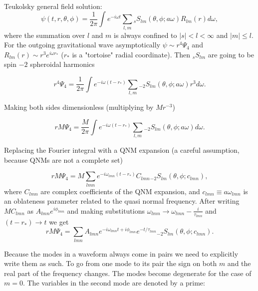 \documentclass[11pt]{article}
\begin{document}
 \\

\noindent
Teukolsky general field solution:
\begin{equation}
\psi(t,r,\theta,\phi) = \frac{1}{2\pi} \int {e^{-i\omega t} \sum_{l,m} {}_sS_{lm}(\theta, \phi ; a\omega )R_{lm}(r) d\omega },
\end{equation}
where the summation over $l$ and $m$ is always confined to $|s|< l < \infty$ and $|m| \leq l$. For the outgoing gravitational wave asymptotically $\psi \sim r^4\Psi_4$ and $R_{lm}(r) \sim r^3e^{i\omega r_*}$ ($r_*$ is a "tortoise" radial coordinate). Then ${}_sS_{lm}$ are going to be spin $\minus 2$ spheroidal harmonics

\begin{equation}
r^4\Psi_4 = \frac{1}{2\pi} \int {e^{-i\omega (t-r_*)} \sum_{l,m} {}_{\minus 2}S_{lm}(\theta, \phi ; a\omega) r^3 d\omega }.
\end{equation}

\noindent
Making both sides dimensionless (multiplying by $Mr^{-3}$)

\begin{equation}
rM\Psi_4 = \frac{M}{2\pi} \int {e^{-i\omega (t-r_*)} \sum_{l,m} {}_{\minus 2}S_{lm}(\theta, \phi ; a\omega) d\omega }.
\end{equation}

\noindent
Replacing the Fourier integral with a QNM expansion (a careful assumption, because QNMs are not a complete set)

\begin{equation}
rM\Psi_4 = M \sum_{lmn}e^{-i\omega_{lmn} (t-r_*)} C_{lmn} {}_{\minus 2}S_{lm}(\theta,\phi ; c_{lmn}), 
\end{equation}
where $C_{lmn}$ are complex coefficients of the QNM expansion, and $c_{lmn} \equiv a\omega_{lmn}$ is an oblateness parameter related to the quasi normal frequency. After writing $MC_{lmn}$ as $A_{lmn}e^{i\phi_{lmn}}$ and making substitutions $\omega_{lmn} \rightarrow  \omega_{lmn} - \frac{i}{\tau_{lmn}}$ and $(t-r_*) \rightarrow t$ we get
\begin{equation}
rM\Psi_4 = \sum_{lmn} A_{lmn} e^{-i\omega_{lmn}t+i\phi_{lmn}}e^{-t/\tau_{lmn}} {}_{\minus 2}S_{lm}(\theta,\phi ; c_{lmn}).
\end{equation}

\noindent
Because the modes in a waveform always come in pairs we need to explicitly write them as such. To go from one mode to its pair the sign on both $m$ and the real part of the frequency changes. The modes become degenerate for the case of $m=0$. The variables in the second mode are denoted by a prime:
\end{document}
